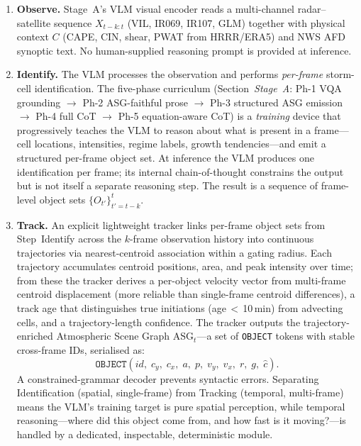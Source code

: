 \documentclass[fleqn,10pt]{wlscirep}
\begin{document}
\begin{enumerate}[leftmargin=*,nosep]
\item \textbf{Observe.}
Stage~A's VLM visual encoder reads a multi-channel radar--satellite sequence $X_{t-k:t}$ (VIL, IR069, IR107, GLM) together with physical context $C$ (CAPE, CIN, shear, PWAT from HRRR/ERA5) and NWS AFD synoptic text.
No human-supplied reasoning prompt is provided at inference.

\item \textbf{Identify.}
The VLM processes the observation and performs \emph{per-frame} storm-cell identification.
The five-phase curriculum (Section~\emph{Stage~A}: Ph-1 VQA grounding $\to$ Ph-2 ASG-faithful prose $\to$ Ph-3 structured ASG emission $\to$ Ph-4 full CoT $\to$ Ph-5 equation-aware CoT) is a \emph{training} device that progressively teaches the VLM to reason about what is present in a frame---cell locations, intensities, regime labels, growth tendencies---and emit a structured per-frame object set.
At inference the VLM produces one identification per frame; its internal chain-of-thought constrains the output but is not itself a separate reasoning step.
The result is a sequence of frame-level object sets $\{O_{t'}\}_{t'=t-k}^{t}$.

\item \textbf{Track.}
An explicit lightweight tracker links per-frame object sets from Step~Identify across the $k$-frame observation history into continuous trajectories via nearest-centroid association within a gating radius.
Each trajectory accumulates centroid positions, area, and peak intensity over time; from these the tracker derives a per-object velocity vector from multi-frame centroid displacement (more reliable than single-frame centroid differences), a track age that distinguishes true initiations (age\,$<$\,10\,min) from advecting cells, and a trajectory-length confidence.
The tracker outputs the trajectory-enriched Atmospheric Scene Graph $\text{ASG}_t$---a set of \texttt{OBJECT} tokens with stable cross-frame IDs, serialised as:
\[
\texttt{OBJECT}(id,\; c_y,\; c_x,\; a,\; p,\; v_y,\; v_x,\; r,\; g,\; \hat{c}).
\]
A constrained-grammar decoder prevents syntactic errors.
Separating Identification (spatial, single-frame) from Tracking (temporal, multi-frame) means the VLM's training target is pure spatial perception, while temporal reasoning---where did this object come from, and how fast is it moving?---is handled by a dedicated, inspectable, deterministic module.


\end{enumerate}
\end{document}
